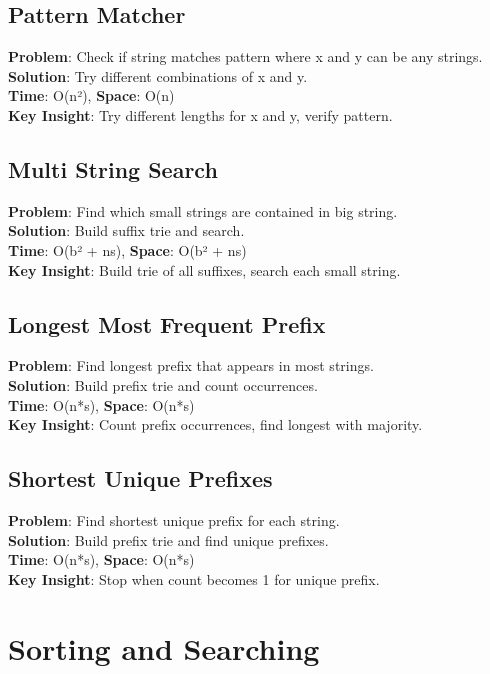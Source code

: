 \documentclass{report}
\begin{document}
\subsection{Pattern Matcher}
\textbf{Problem}: Check if string matches pattern where x and y can be any strings.\\
\textbf{Solution}: Try different combinations of x and y.\\
\textbf{Time}: O(n²), \textbf{Space}: O(n)\\
\textbf{Key Insight}: Try different lengths for x and y, verify pattern.

\subsection{Multi String Search}
\textbf{Problem}: Find which small strings are contained in big string.\\
\textbf{Solution}: Build suffix trie and search.\\
\textbf{Time}: O(b² + ns), \textbf{Space}: O(b² + ns)\\
\textbf{Key Insight}: Build trie of all suffixes, search each small string.

\subsection{Longest Most Frequent Prefix}
\textbf{Problem}: Find longest prefix that appears in most strings.\\
\textbf{Solution}: Build prefix trie and count occurrences.\\
\textbf{Time}: O(n*s), \textbf{Space}: O(n*s)\\
\textbf{Key Insight}: Count prefix occurrences, find longest with majority.

\subsection{Shortest Unique Prefixes}
\textbf{Problem}: Find shortest unique prefix for each string.\\
\textbf{Solution}: Build prefix trie and find unique prefixes.\\
\textbf{Time}: O(n*s), \textbf{Space}: O(n*s)\\
\textbf{Key Insight}: Stop when count becomes 1 for unique prefix.

\section{Sorting and Searching}
\end{document}
